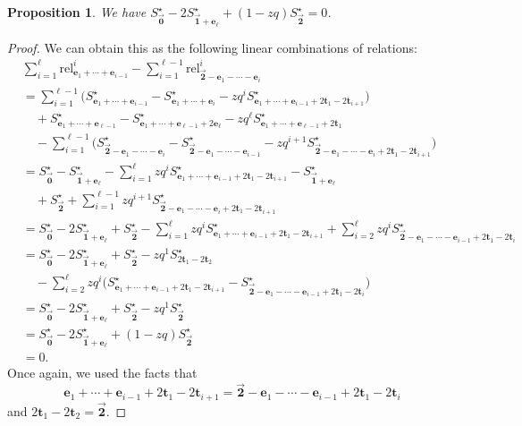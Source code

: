 \documentclass[pdftex]{sigma}
\numberwithin{equation}{section}
\newtheorem{Proposition}[Theorem]{Proposition}
\theoremstyle{definition}
\newcommand{\rel}{\text{rel}}
\newcommand{\tr}{\mathbf{t}}
\newcommand{\ee}{\mathbf{e}}
\newcommand{\two}{\vec{\mathbf{2}}}
\newcommand{\one}{\vec{\mathbf{1}}}
\newcommand{\zero}{\vec{\mathbf{0}}}
\begin{document}
\begin{Proposition} \label{prop:comp1_AB}
We have $S^\star_{\zero} - 2S^\star_{\one+\ee_\ell} + (1-zq) S^\star_{\two}=0$.
\end{Proposition}
\begin{proof}
We can obtain this as the following linear combinations of relations:
\begin{align*}
&\sum_{i=1}^\ell \rel^i_{\ee_1+\cdots+\ee_{i-1}} - \sum_{i=1}^{\ell-1}\rel^i_{\two-\ee_1-\cdots-\ee_i} \\
&=\sum_{i=1}^{\ell-1} \bigl(
S^\star_{\ee_1+\cdots+\ee_{i-1}} - S^\star_{\ee_1+\cdots+\ee_i} - zq^{i} S^\star_{\ee_1+\cdots+\ee_{i-1}+2\tr_1-2\tr_{i+1}}\bigr) \\
&\quad+S^\star_{\ee_1+\cdots+\ee_{\ell-1}} - S^\star_{{\ee_1+\cdots+\ee_{\ell-1}}+2\ee_\ell} - zq^{\ell} S^\star_{{\ee_1+\cdots+\ee_{\ell-1}}+2\tr_1} \\
&\quad- \sum_{i=1}^{\ell-1}\bigl(
S^\star_{\two-\ee_1-\cdots-\ee_i} - S^\star_{\two-\ee_1-\cdots-\ee_{i-1}} - zq^{i+1} S^\star_{\two-\ee_1-\cdots-\ee_i+2\tr_1-2\tr_{i+1}}\bigr) \\
&=
S^\star_{\zero} - S^\star_{\one+\ee_\ell} - \sum_{i=1}^{\ell} zq^{i} S^\star_{\ee_1+\cdots+\ee_{i-1}+2\tr_1-2\tr_{i+1}} -
S^\star_{\one+\ee_\ell}\\
&\quad + S^\star_{\two} + \sum_{i=1}^{\ell-1}zq^{i+1} S^\star_{\two-\ee_1-\cdots-\ee_i+2\tr_1-2\tr_{i+1}} \\
&=
S^\star_{\zero} -2S^\star_{\one+\ee_\ell} + S^\star_{\two} - \sum_{i=1}^\ell zq^{i} S^\star_{\ee_1+\cdots+\ee_{i-1}+2\tr_1-2\tr_{i+1}} + \sum_{i=2}^{\ell}zq^{i} S^\star_{\two-\ee_1-\cdots-\ee_{i-1}+2\tr_1-2\tr_{i}} \\
&= S^\star_{\zero} -2S^\star_{\one+\ee_\ell} + S^\star_{\two} -
 zq^{1} S^\star_{2\tr_1-2\tr_{2}}\\
 &\quad -\sum_{i=2}^\ell zq^{i} \bigl(S^\star_{\ee_1+\cdots+\ee_{i-1}+2\tr_1-2\tr_{i+1}} -S^\star_{\two-\ee_1-\cdots-\ee_{i-1}+2\tr_1-2\tr_{i}}\bigr) \\
&= S^\star_{\zero} - 2S^\star_{\one+\ee_\ell} + S^\star_{\two} -
 zq^{1} S^\star_{\two} \\
&= S^\star_{\zero} - 2S^\star_{\one+\ee_\ell} + (1-zq)S^\star_{\two} \\
&=0.
\end{align*}
Once again, we used the facts that \[{\ee_1+\cdots+\ee_{i-1}+2\tr_1-2\tr_{i+1}}={\two-\ee_1-\cdots-\ee_{i-1}+2\tr_1-2\tr_{i}}\] and $2\tr_1-2\tr_2=\two$.
\end{proof}
\end{document}
